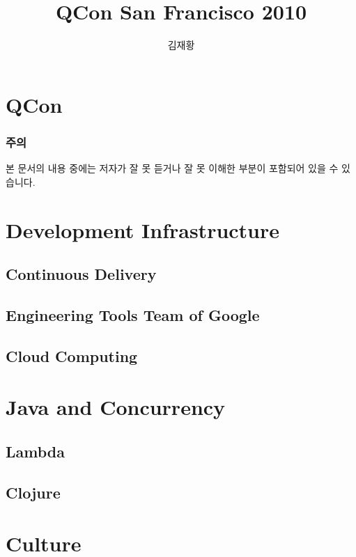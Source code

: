 \documentclass[10pt,unicode,serif,compress,slidetop]{beamer}
\title{QCon San Francisco 2010}
\author{김재황}
\institute{소프트웨어 센터}
\begin{document}
\begin{frame}[plain]
    \titlepage
\end{frame}

\section{QCon}


\begin{frame}
\frametitle{주의}

본 문서의 내용 중에는 저자가 잘 못 듣거나 잘 못 이해한 부분이 
포함되어 있을 수 있습니다.

\end{frame}

\section{Development Infrastructure}
\subsection{Continuous Delivery}

\subsection{Engineering Tools Team of Google}

\subsection{Cloud Computing}


\section{Java and Concurrency}

\subsection{Lambda}


\subsection{Clojure}



\section{Culture}
\end{document}
